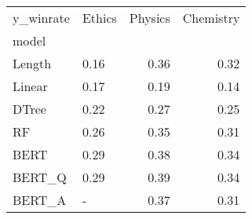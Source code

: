 \begin{tabular}{llrr}
\toprule
y\_winrate & Ethics &  Physics &  Chemistry \\
model  &        &          &            \\
\midrule
Length &   0.16 &     0.36 &       0.32 \\
Linear &   0.17 &     0.19 &       0.14 \\
DTree  &   0.22 &     0.27 &       0.25 \\
RF     &   0.26 &     0.35 &       0.31 \\
BERT   &   0.29 &     0.38 &       0.34 \\
BERT\_Q &   0.29 &     0.39 &       0.34 \\
BERT\_A &      - &     0.37 &       0.31 \\
\bottomrule
\end{tabular}
